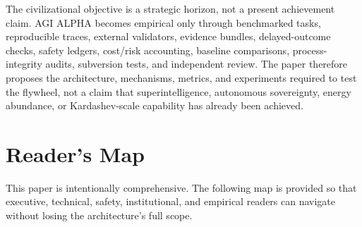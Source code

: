 The civilizational objective is a strategic horizon, not a present
achievement claim. AGI ALPHA becomes empirical only through benchmarked
tasks, reproducible traces, external validators, evidence bundles,
delayed-outcome checks, safety ledgers, cost/risk accounting, baseline
comparisons, process-integrity audits, subversion tests, and independent
review. The paper therefore proposes the architecture, mechanisms,
metrics, and experiments required to test the flywheel, not a claim that
superintelligence, autonomous sovereignty, energy abundance, or
Kardashev-scale capability has already been achieved.

\section{Reader's Map}\label{readers-map}

This paper is intentionally comprehensive. The following map is provided
so that executive, technical, safety, institutional, and empirical
readers can navigate without losing the architecture's full scope.

